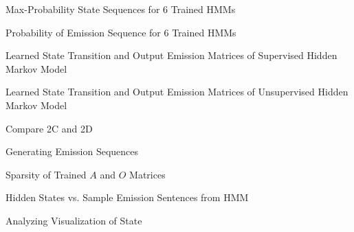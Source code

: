 \indent\problem[10] %
Max-Probability State Sequences for 6 Trained HMMs
\begin{subsolution}
	
\end{subsolution}
\clearpage

\indent\problem[17] %
Probability of Emission Sequence for 6 Trained HMMs
\begin{subsolution}
	
\end{subsolution}
\clearpage

\noindent\problem[10] %
Learned State Transition and Output Emission Matrices of Supervised Hidden Markov Model
\begin{subsolution}
	
\end{subsolution}
\clearpage

\indent\problem[15] %
Learned State Transition and Output Emission Matrices of Unsupervised Hidden Markov Model
\begin{subsolution}
	
\end{subsolution}
\clearpage

\problem[5] Compare 2C and 2D
\begin{subsolution}
	
\end{subsolution}
\clearpage

\problem[5] Generating Emission Sequences
\begin{subsolution}
	
\end{subsolution}
\clearpage

\indent\problem[3] %
Sparsity of Trained $A$ and $O$ Matrices
\begin{subsolution}
	
\end{subsolution}
\clearpage

\indent\problem[5] %
Hidden States vs. Sample Emission Sentences from HMM

\begin{subsolution}
	
\end{subsolution}
\clearpage


\indent\problem[5] %
Analyzing Visualization of State
\begin{subsolution}
	
\end{subsolution}
\clearpage



